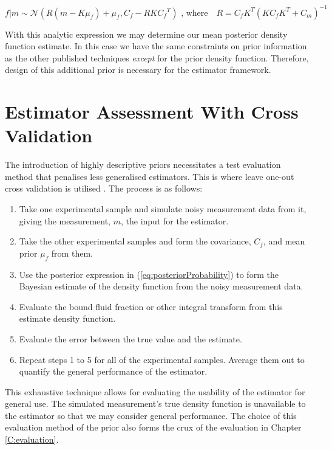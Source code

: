 \begin{equation}
    \label{eq:posteriorProbability}
    f|m \sim \mathcal{N}(R(m-K\mu_f) + \mu_f, C_f - RKC{_f}^T)   \text{  , where} \quad R = C_f K^T (KC_fK^T + C_m)^{-1}
\end{equation}

With this analytic expression we may determine our mean posterior density function estimate. In this case we have the same constraints on prior information as the other published techniques \textit{except} for the prior density function. Therefore, design of this additional prior is necessary for the estimator framework.

\section{Estimator Assessment With Cross Validation} \label{section:crossValidation}

The introduction of highly descriptive priors necessitates a test evaluation method that penalises less generalised estimators. This is where leave one-out cross validation is utilised \cite{crossValidation}. The process is as follows:
\begin{enumerate}
    \item Take one experimental sample and simulate noisy measurement data from it, giving the measurement, $m$, the input for the estimator.
    \item Take the other experimental samples and form the covariance, $C_f$, and mean prior $\mu_f$ from them.
    \item Use the posterior expression in (\ref{eq:posteriorProbability}) to form the Bayesian estimate of the density function from the noisy measurement data.
    \item Evaluate the bound fluid fraction or other integral transform from this estimate density function.
    \item Evaluate the error between the true value and the estimate.
    \item Repeat steps 1 to 5 for all of the experimental samples. Average them out to quantify the general performance of the estimator.
\end{enumerate}
This exhaustive technique allows for evaluating the usability of the estimator for general use. The simulated measurement's true density function is unavailable to the estimator so that we may consider general performance. The choice of this evaluation method of the prior also forms the crux of the evaluation in Chapter \ref{C:evaluation}.





